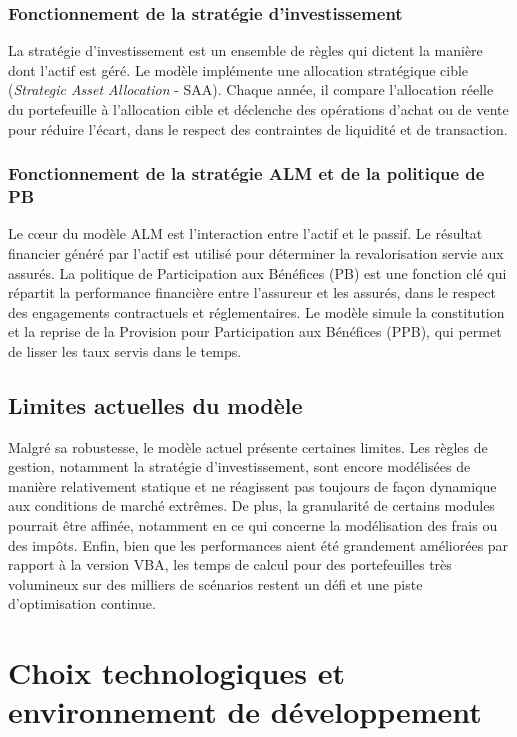 \subsubsection{Fonctionnement de la stratégie d'investissement}
La stratégie d'investissement est un ensemble de règles qui dictent la manière dont l'actif est géré. Le modèle implémente une allocation stratégique cible (\textit{Strategic Asset Allocation} - SAA). Chaque année, il compare l'allocation réelle du portefeuille à l'allocation cible et déclenche des opérations d'achat ou de vente pour réduire l'écart, dans le respect des contraintes de liquidité et de transaction.

\subsubsection{Fonctionnement de la stratégie ALM et de la politique de PB}
Le cœur du modèle ALM est l'interaction entre l'actif et le passif. Le résultat financier généré par l'actif est utilisé pour déterminer la revalorisation servie aux assurés. La politique de Participation aux Bénéfices (PB) est une fonction clé qui répartit la performance financière entre l'assureur et les assurés, dans le respect des engagements contractuels et réglementaires. Le modèle simule la constitution et la reprise de la Provision pour Participation aux Bénéfices (PPB), qui permet de lisser les taux servis dans le temps.

\subsection{Limites actuelles du modèle}
Malgré sa robustesse, le modèle actuel présente certaines limites. Les règles de gestion, notamment la stratégie d'investissement, sont encore modélisées de manière relativement statique et ne réagissent pas toujours de façon dynamique aux conditions de marché extrêmes. De plus, la granularité de certains modules pourrait être affinée, notamment en ce qui concerne la modélisation des frais ou des impôts. Enfin, bien que les performances aient été grandement améliorées par rapport à la version VBA, les temps de calcul pour des portefeuilles très volumineux sur des milliers de scénarios restent un défi et une piste d'optimisation continue.

\section{Choix technologiques et environnement de développement}

